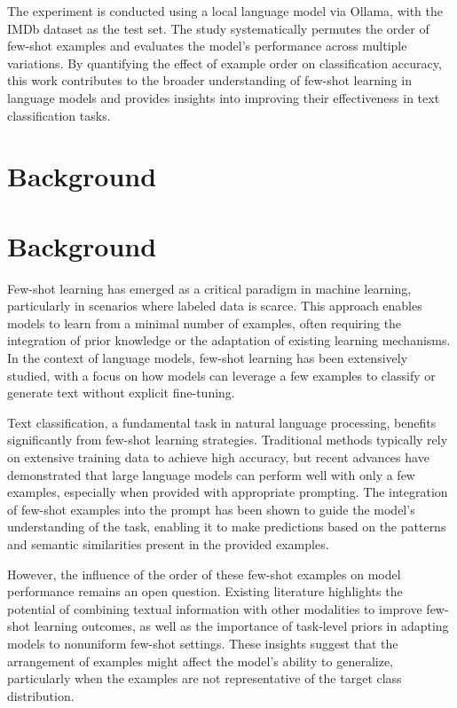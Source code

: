\documentclass{article}
\begin{document}
The experiment is conducted using a local language model via Ollama, with the IMDb dataset as the test set. The study systematically permutes the order of few-shot examples and evaluates the model's performance across multiple variations. By quantifying the effect of example order on classification accuracy, this work contributes to the broader understanding of few-shot learning in language models and provides insights into improving their effectiveness in text classification tasks.
\section{Background}
\section{Background}

Few-shot learning has emerged as a critical paradigm in machine learning, particularly in scenarios where labeled data is scarce. This approach enables models to learn from a minimal number of examples, often requiring the integration of prior knowledge or the adaptation of existing learning mechanisms. In the context of language models, few-shot learning has been extensively studied, with a focus on how models can leverage a few examples to classify or generate text without explicit fine-tuning. 

Text classification, a fundamental task in natural language processing, benefits significantly from few-shot learning strategies. Traditional methods typically rely on extensive training data to achieve high accuracy, but recent advances have demonstrated that large language models can perform well with only a few examples, especially when provided with appropriate prompting. The integration of few-shot examples into the prompt has been shown to guide the model's understanding of the task, enabling it to make predictions based on the patterns and semantic similarities present in the provided examples.

However, the influence of the order of these few-shot examples on model performance remains an open question. Existing literature highlights the potential of combining textual information with other modalities to improve few-shot learning outcomes, as well as the importance of task-level priors in adapting models to nonuniform few-shot settings. These insights suggest that the arrangement of examples might affect the model's ability to generalize, particularly when the examples are not representative of the target class distribution. 
\end{document}
